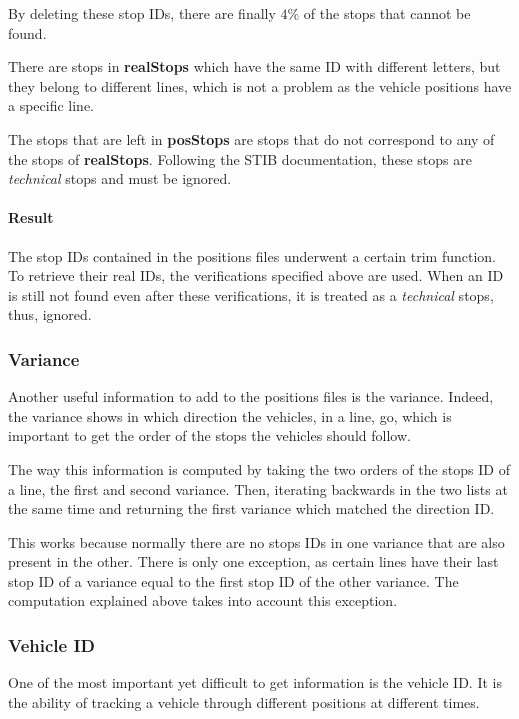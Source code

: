 \documentclass{article}
\begin{document}
By deleting these stop IDs, there are finally $4\%$ of the stops that cannot be found.

There are stops in \textbf{realStops} which have the same ID with different letters, but they belong to different lines, which is not a problem as the vehicle positions have a specific line.

The stops that are left in \textbf{posStops} are stops that do not correspond to any of the stops of \textbf{realStops}. Following the STIB documentation, these stops are \textit{technical} stops and must be ignored.

\paragraph{Result}

The stop IDs contained in the positions files underwent a certain trim function. To retrieve their real IDs, the verifications specified above are used. When an ID is still not found even after these verifications, it is treated as a \textit{technical} stops, thus, ignored.


\subsubsection{Variance}

Another useful information to add to the positions files is the variance. Indeed, the variance shows in which direction the vehicles, in a line, go, which is important to get the order of the stops the vehicles should follow.

The way this information is computed by taking the two orders of the stops ID of a line, the first and second variance. Then, iterating backwards in the two lists at the same time and returning the first variance which matched the direction ID.

This works because normally there are no stops IDs in one variance that are also present in the other. There is only one exception, as certain lines have their last stop ID of a variance equal to the first stop ID of the other variance. The computation explained above takes into account this exception.


\subsubsection{Vehicle ID}

One of the most important yet difficult to get information is the vehicle ID. It is the ability of tracking a vehicle through different positions at different times.
\end{document}
